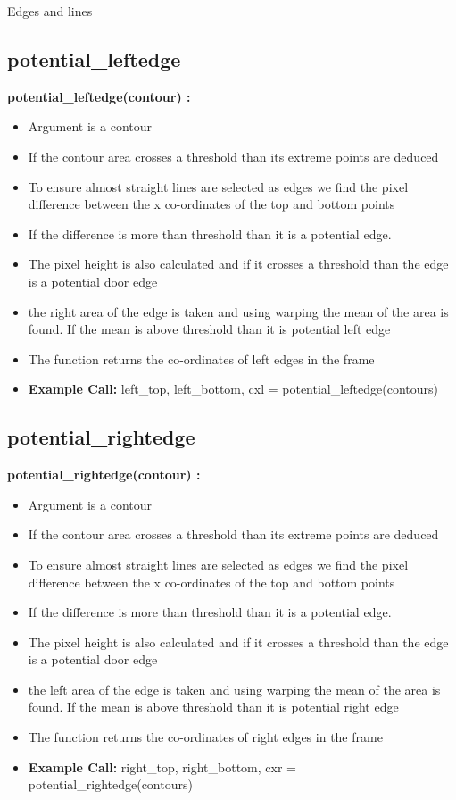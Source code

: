 \documentclass[10pt, a4paper]{beamer}
\begin{document}
\begin{frame}[allowframebreaks]{Edges and lines}
  \subsection{potential\_leftedge}
    \textbf{potential\_leftedge(contour) : }
      \begin{itemize}
       \item Argument is a contour
       \item If the contour area crosses a threshold than its extreme points are deduced
       \item To ensure almost straight lines are selected as edges we find the pixel difference between the x co-ordinates of the top and bottom points
       \item If the difference is more than threshold than it is a potential edge. 
       \item The pixel height is also calculated and if it crosses a threshold than the edge is a potential door edge
       \item the right area of the edge is taken and using warping the mean of the area is found. If the mean is above threshold than it is potential left edge
       \item The function returns the co-ordinates of left edges in the frame
       \item \textbf{Example Call:} left\_top, left\_bottom, cxl = potential\_leftedge(contours)
      \end{itemize}
\framebreak
  \subsection{potential\_rightedge}
    \textbf{potential\_rightedge(contour) : }
      \begin{itemize}
       \item Argument is a contour
       \item If the contour area crosses a threshold than its extreme points are deduced
       \item To ensure almost straight lines are selected as edges we find the pixel difference between the x co-ordinates of the top and bottom points
       \item If the difference is more than threshold than it is a potential edge. 
       \item The pixel height is also calculated and if it crosses a threshold than the edge is a potential door edge
       \item the left area of the edge is taken and using warping the mean of the area is found. If the mean is above threshold than it is potential right edge
       \item The function returns the co-ordinates of right edges in the frame
       \item \textbf{Example Call:} right\_top, right\_bottom, cxr = potential\_rightedge(contours)
      \end{itemize}
\end{frame}
\end{document}
